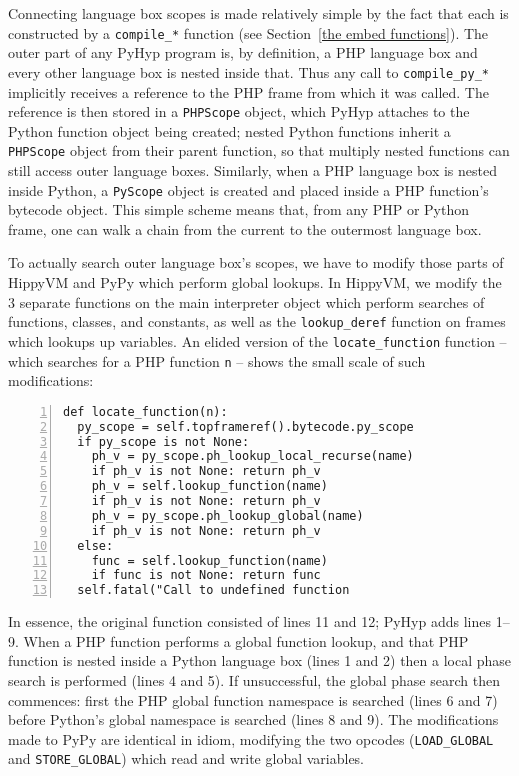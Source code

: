 \documentclass[a4paper,UKenglish]{lipics-v2016}
\newcommand{\ourvm}{PyHyp\xspace}
\newcommand{\hippy}{HippyVM\xspace}
\newcommand{\pypy}{PyPy\xspace}
\begin{document}
Connecting language box scopes is made relatively simple by the fact that each
is constructed by a \texttt{compile\_*} function (see Section~\ref{the embed
functions}). The outer part of any \ourvm program is, by definition, a PHP
language box and every other language box is nested inside that. Thus
any call to \texttt{compile\_py\_*} implicitly receives a reference
to the PHP frame from which it was called. The reference is
then stored in a \texttt{PHPScope} object,
which \ourvm attaches to the Python function object being
created; nested Python functions inherit a \texttt{PHPScope} object
from their parent function, so that multiply nested functions can still access
outer language boxes. Similarly, when a PHP language box is nested inside Python,
a \texttt{PyScope} object is created and placed inside a PHP function's
bytecode object. This simple scheme means that, from any PHP or
Python frame, one can walk a chain from the current to the outermost language box.

To actually search outer language box's scopes, we have to modify those parts
of \hippy and \pypy which perform global lookups. In \hippy, we modify the
3 separate functions on the main interpreter object which perform searches of
functions, classes, and constants, as well as the \texttt{lookup\_deref}
function on frames which lookups up variables. An elided version of the
\texttt{locate\_function} function -- which searches for a PHP function
\texttt{n} -- shows the small scale of such modifications:
\begin{lstlisting}[numbers=left]
def locate_function(n):
  py_scope = self.topframeref().bytecode.py_scope
  if py_scope is not None:
    ph_v = py_scope.ph_lookup_local_recurse(name)
    if ph_v is not None: return ph_v
    ph_v = self.lookup_function(name)
    if ph_v is not None: return ph_v
    ph_v = py_scope.ph_lookup_global(name)
    if ph_v is not None: return ph_v
  else:
    func = self.lookup_function(name)
    if func is not None: return func
  self.fatal("Call to undefined function \end{lstlisting}
In essence, the original function consisted of lines 11 and 12; \ourvm adds
lines 1--9. When a PHP function performs a global function lookup, and
that PHP function is nested inside a Python language box (lines 1 and 2)
then a local phase search is performed (lines 4 and 5). If unsuccessful, the global
phase search then commences: first the PHP global function namespace is searched
(lines 6 and 7) before Python's global namespace is searched (lines 8 and 9).
The modifications made to \pypy are identical in idiom, modifying
the two opcodes (\texttt{LOAD\_GLOBAL} and
\texttt{STORE\_GLOBAL}) which read and write global variables.
\end{document}
